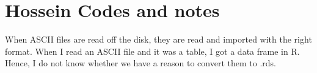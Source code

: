 \section{Hossein Codes and notes}

When ASCII files are read off the disk, they are
read and imported with the right format. When I read an ASCII file
and it was a table, I got a data frame in R. Hence, I do not know 
whether we have a reason to convert them to .rds.